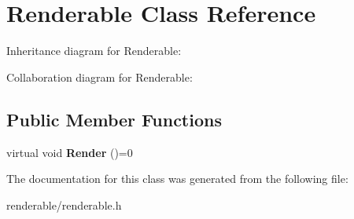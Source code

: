\hypertarget{classRenderable}{}\section{Renderable Class Reference}
\label{classRenderable}


Inheritance diagram for Renderable\+:


Collaboration diagram for Renderable\+:
\subsection*{Public Member Functions}
\begin{DoxyCompactItemize}
\item 
virtual void {\bfseries Render} ()=0\hypertarget{classRenderable_a6bc986f9a3962fc06bc1c7f9b729104f}{}\label{classRenderable_a6bc986f9a3962fc06bc1c7f9b729104f}

\end{DoxyCompactItemize}


The documentation for this class was generated from the following file\+:\begin{DoxyCompactItemize}
\item 
renderable/renderable.\+h\end{DoxyCompactItemize}
